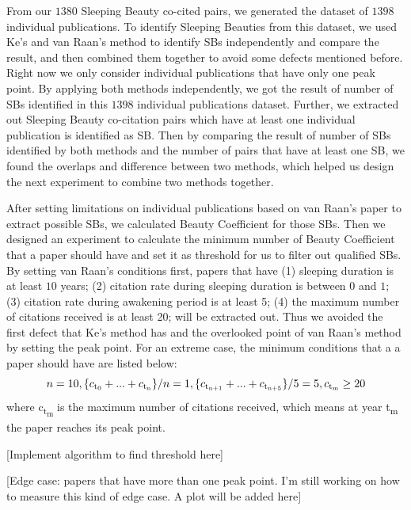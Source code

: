 \documentclass[utf8]{frontiersSCNS}
\begin{document}
{From our $1380$ Sleeping Beauty co-cited pairs, we generated the dataset of $1398$ individual publications. To identify Sleeping Beauties from this dataset, we used Ke's and van Raan's method to identify SBs independently and compare the result, and then combined them together to avoid some defects mentioned before. Right now we only consider individual publications that have only one peak point. By applying both methods independently, we got the result of number of SBs identified in this $1398$ individual publications dataset. Further, we extracted out Sleeping Beauty co-citation pairs which have at least one individual publication is identified as SB. Then by comparing the result of number of SBs identified by both methods and the number of pairs that have at least one SB, we found the overlaps and difference between two methods, which helped us design the next experiment to combine two methods together.

After setting limitations on individual publications based on van Raan's paper to extract possible SBs, we calculated Beauty Coefficient for those SBs. Then we designed an experiment to calculate the minimum number of Beauty Coefficient that a paper should have and set it as threshold for us to filter out qualified SBs. By setting van Raan's conditions first, papers that have (1) sleeping duration is at least $10$ years; (2) citation rate during sleeping duration is between $0$ and $1$; (3) citation rate during awakening period is at least 5; (4) the maximum number of citations received is at least 20; will be extracted out. Thus we avoided the first defect that Ke's method has and the overlooked point of van Raan's method by setting the peak point. For an extreme case, the minimum conditions that a a paper should have are listed below:
\begin{equation}
n = 10,  \{c\textsubscript{t\textsubscript{0}} + ... + c\textsubscript{t\textsubscript{n}}\}/n = 1, \{c\textsubscript{t\textsubscript{n+1}} + ... + c\textsubscript{t\textsubscript{n+5}}\}/5 = 5, c\textsubscript{t\textsubscript{m}} \geq 20
\end{equation}
where c\textsubscript{t\textsubscript{m}} is the maximum number of citations received, which means at year t\textsubscript{m} the paper reaches its peak point. 

[Implement algorithm to find threshold here]

[Edge case: papers that have more than one peak point. I'm still working on how to measure this kind of edge case. A plot will be added here]


}
\end{document}
